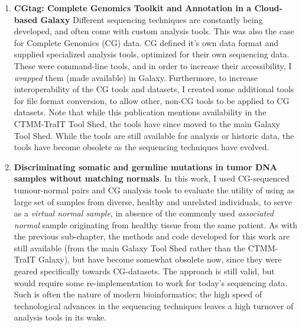 \begin{enumerate}[label=\ref{chapter:virtualnormal}.\arabic*]
\itemsep-0.5em
\setcounter{enumi}{-1}
\item \textbf{CGtag: Complete Genomics Toolkit and Annotation in a Cloud-based Galaxy}
Different sequencing techniques are constantly being developed, and often come with custom analysis tools. This was also the case for Complete Genomics (CG) data. CG defined it's own data format and supplied specialized analysis tools, optimized for their own sequencing data. These were command-line tools, and in order to increase their accessibility, I \emph{wrapped} them (made available) in Galaxy. Furthermore, to increase interoperability of the CG tools and datasets, I created some additional tools for file format conversion, to allow other, non-CG tools to be applied to CG datasets. Note that while this publication mentions availability in the CTMM-TraIT Tool Shed, the tools have since moved to the main Galaxy Tool Shed. While the tools are still available for analysis or historic data, the tools have become obsolete as the sequencing techniques have evolved.

\item \textbf{Discriminating somatic and germline mutations in tumor DNA samples without matching normals}. In this work, I used CG-sequenced tumour-normal pairs and CG analysis tools to evaluate the utility of using as large set of samples from diverse, healthy and unrelated individuals, to serve as a \emph{virtual normal sample}, in absence of the commonly used \emph{associated normal} sample originating from healthy tissue from the same patient. As with the previous sub-chapter, the methods and code developed for this work are still available (from the main Galaxy Tool Shed rather than the CTMM-TraIT Galaxy), but have become somewhat obsolete now, since they were geared specifically towards CG-datasets. The approach is still valid, but would require some re-implementation to work for today's sequencing data. Such is often the nature of modern bioinformatics; the high speed of technological advances in the sequencing techniques leaves a high turnover of analysis tools in its wake.


\end{enumerate}
